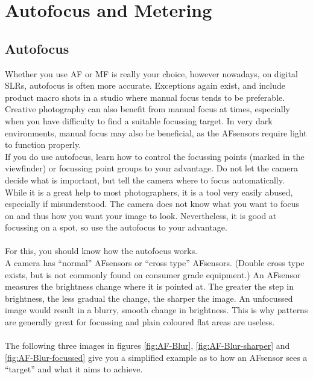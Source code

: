 \chapter{Autofocus and Metering}


\section{Autofocus}
\label{sec:autofocus}

Whether you use \gls{AF} or \gls{MF} is really your choice, however nowadays, on digital \glspl{SLR}, autofocus is often more accurate. Exceptions again exist, and include product macro shots in a studio where manual focus tends to be preferable. Creative photography can also benefit from manual focus at times, especially when you have difficulty to find a suitable focussing target. In very dark environments, manual focus may also be beneficial, as the \glspl{AFsensor} require light to function properly.
\\
If you do use autofocus, learn how to control the focussing points (marked in the \gls{viewfinder}) or focussing point groups to your advantage. Do not let the camera decide what is important, but tell the camera where to focus automatically. While it is a great help to most photographers, it is a tool very easily abused, especially if misunderstood. The camera does not know what you want to focus on and thus how you want your image to look. Nevertheless, it is good at focussing on a spot, so use the autofocus to your advantage.
\\
\\
For this, you should know how the autofocus works.
\\
A camera has ``normal'' \glspl{AFsensor} or ``cross type'' \glspl{AFsensor}. (Double cross type exists, but is not commonly found on consumer grade equipment.) An \gls{AFsensor} measures the brightness change where it is pointed at. The greater the step in brightness, the less gradual the change, the sharper the image. An unfocussed image would result in a blurry, smooth change in brightness. This is why patterns are generally great for focussing and plain coloured flat areas are useless.
\\
\\
The following three images in figures \ref{fig:AF-Blur}, \ref{fig:AF-Blur-sharper} and \ref{fig:AF-Blur-focussed} give you a simplified example as to how an \gls{AFsensor} sees a ``target'' and what it aims to achieve.

